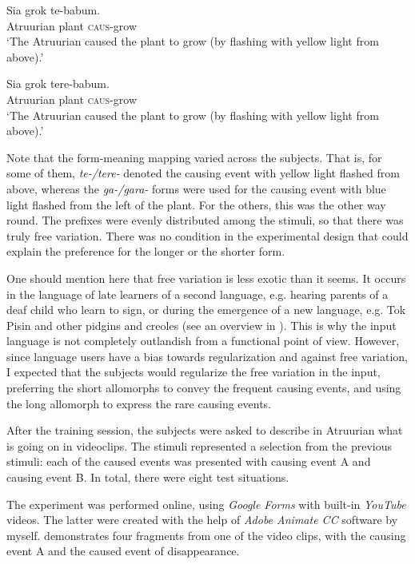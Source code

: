 \documentclass[output=paper]{langsci/langscibook}
\begin{document}
\ea
\ea
\gll  Sia    grok  te-babum.\\
       Atruurian   plant   \textsc{caus}{}-grow\\
\glt ‘The Atruurian caused the plant to grow (by flashing with yellow light from above).'

\ex
\gll  Sia    grok  tere-babum.\\
       Atruurian   plant   \textsc{caus}{}-grow\\
\glt ‘The Atruurian caused the plant to grow (by flashing with yellow light from above).'
\z
\z

Note that the form-meaning mapping varied across the subjects. That is, for some of them, \textit{te-/tere-} denoted the causing event with yellow light flashed from above, whereas the \textit{ga-/gara-} forms were used for the causing event with blue light flashed from the left of the plant. For the others, this was the other way round. The prefixes were evenly distributed among the stimuli, so that there was truly free variation. There was no condition in the experimental design that could explain the preference for the longer or the shorter form.  

One should mention here that free variation is less exotic than it seems. It occurs in the language of late learners of a second language, e.g. hearing parents of a deaf child who learn to sign, or during the emergence of a new language, e.g. Tok Pisin and other pidgins and creoles (see an overview in \citealt{HudsonKamNewport2009}). This is why the input language is not completely outlandish from a functional point of view. However, since language users have a bias towards regularization and against free variation, I expected that the subjects would regularize the free variation in the input, preferring the short allomorphs to convey the frequent causing events, and using the long allomorph to express the rare causing events.

After the training session, the subjects were asked to describe in Atruurian what is going on in videoclips. The stimuli represented a selection from the previous stimuli: each of the caused events was presented with causing event A and causing event B. In total, there were eight test situations. 

The experiment was performed online, using \textit{Google Forms} with built-in \textit{YouTube} videos. The latter were created with the help of \textit{Adobe Animate CC} software by myself.  demonstrates four fragments from one of the video clips, with the causing event A and the caused event of disappearance.
\end{document}
